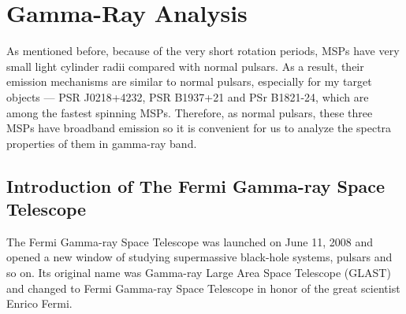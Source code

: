 \documentclass[12pt]{report}
\newcommand{\mycaption}[1]{\caption{\textit{\footnotesize #1}}}
\begin{document}



  \chapter{Gamma-Ray Analysis}
      As mentioned before, because of the very short rotation periods, MSPs have very small light cylinder radii 
      compared with normal pulsars. As a result, their emission mechanisms are similar to normal pulsars, 
      especially for my target objects --- PSR J0218+4232, PSR B1937+21 and PSr B1821-24, 
      which are among the fastest spinning MSPs. Therefore, as normal pulsars, these three 
      MSPs have broadband emission so it is convenient for us to analyze the spectra 
      properties of them in gamma-ray band.
  
      \section{Introduction of The Fermi Gamma-ray Space Telescope}
        The Fermi Gamma-ray Space Telescope was launched on June 11, 2008 and opened a new window of studying
        supermassive black-hole systems, pulsars and so on. Its original name was Gamma-ray Large Area Space 
        Telescope (GLAST) and changed to Fermi Gamma-ray Space Telescope in honor of the great scientist 
        Enrico Fermi. 
\end{document}
